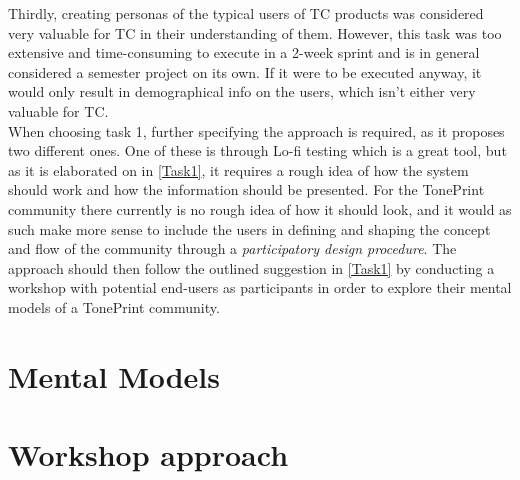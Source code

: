 Thirdly, creating personas of the typical users of TC products was considered very valuable for TC in their understanding of them. However, this task was too extensive and time-consuming to execute in a 2-week sprint and is in general considered a semester project on its own. If it were to be executed anyway, it would only result in demographical info on the users, which isn't either very valuable for TC.\\

\noindent
When choosing task 1, further specifying the approach is required, as it proposes two different ones. One of these is through Lo-fi testing which is a great tool, but as it is elaborated on in \autoref{Task1}, it requires a rough idea of how the system should work and how the information should be presented. For the TonePrint community there currently is no rough idea of how it should look, and it would as such make more sense to include the users in defining and shaping the concept and flow of the community through a \textit{participatory design procedure}. The approach should then follow the outlined suggestion in \autoref{Task1} by conducting a workshop with potential end-users as participants in order to explore their mental models of a TonePrint community.


\section{Mental Models}
\label{MentalModel}


\section{Workshop approach}
\label{WorkshopApproach}












